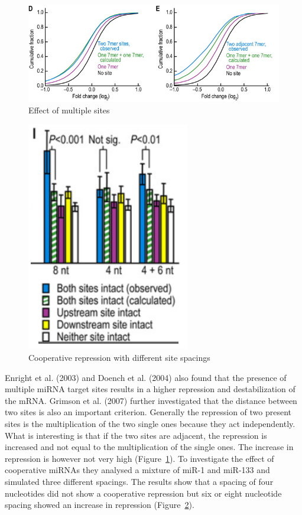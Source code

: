\documentclass[11pt, a4paper, twoside]{book}
\begin{document}
\begin{figure}
\centering
\includegraphics[scale=0.65]{results/sites_distance.PNG}
\caption{Effect of multiple sites}
\label{sitedistance}
\end{figure}

\begin{figure}
\centering
\includegraphics[scale=0.6]{results/sites_8nt.PNG}  
\caption{Cooperative repression with different site spacings}
\label{sitespacing}
\end{figure}

Enright et al. (2003) and Doench et al. (2004) also found that the presence of multiple miRNA target sites results in a higher repression and destabilization of the mRNA. Grimson et al. (2007) further investigated that the distance between two sites is also an important criterion. Generally the repression of two present sites is the multiplication of the two single ones because they act independently. What is interesting is that if the two sites are adjacent, the repression is increased and not equal to the multiplication of the single ones. The increase in repression is however not very high (Figure~\ref{sitedistance}). To investigate the effect of cooperative miRNAs they analysed a mixture of miR-1 and miR-133 and simulated three different spacings. The results show that a spacing of four nucleotides did not show a cooperative repression but six or eight nucleotide spacing showed an increase in repression (Figure~\ref{sitespacing}). \\
\end{document}
